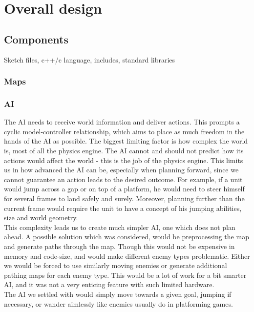 \chapter{Overall design}

\section{Components}
Sketch files, c++/c language, includes, standard libraries

\subsection{Maps}

\subsection{AI} %
The AI needs to receive world information and deliver actions. This prompts a cyclic model-controller relationship, which aims to place as much freedom in the hands of the AI as possible. The biggest limiting factor is how complex the world is, most of all the physics engine. The AI cannot and should not predict how its actions would affect the world - this is the job of the physics engine. This limits us in how advanced the AI can be, especially when planning forward, since we cannot guarantee an action leads to the desired outcome. For example, if a unit would jump across a gap or on top of a platform, he would need to steer himself for several frames to land safely and surely. Moreover, planning further than the current frame would require the unit to have a concept of his jumping abilities, size and world geometry.\\
This complexity leads us to create much simpler AI, one which does not plan ahead. A possible solution which was considered, would be preprocessing the map and generate paths through the map. Though this would not be expensive in memory and code-size, and would make different enemy types problematic. Either we would be forced to use similarly moving enemies or generate additional pathing maps for each enemy type. This would be a lot of work for a bit smarter AI, and it was not a very enticing feature with such limited hardware.\\
The AI we settled with would simply move towards a given goal, jumping if necessary, or wander aimlessly like enemies usually do in platforming games.

